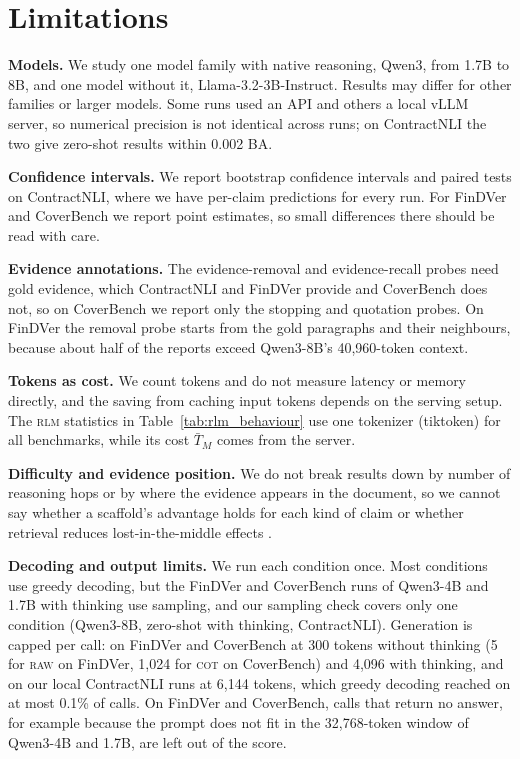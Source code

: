 \documentclass[11pt]{article}
\begin{document}
\section*{Limitations}

\noindent \textbf{Models.}
We study one model family with native reasoning, Qwen3, from 1.7B to 8B,
and one model without it, Llama-3.2-3B-Instruct. Results may differ for
other families or larger models. Some runs used an API and others a local
vLLM server, so numerical precision is not identical across runs; on
ContractNLI the two give zero-shot results within 0.002 BA.

\noindent \textbf{Confidence intervals.}
We report bootstrap confidence intervals and paired tests on ContractNLI,
where we have per-claim predictions for every run. For FinDVer and
CoverBench we report point estimates, so small differences there should
be read with care.

\noindent \textbf{Evidence annotations.}
The evidence-removal and evidence-recall probes need gold evidence, which
ContractNLI and FinDVer provide and CoverBench does not, so on CoverBench
we report only the stopping and quotation probes. On FinDVer the removal
probe starts from the gold paragraphs and their neighbours, because about
half of the reports exceed Qwen3-8B's 40,960-token context.

\noindent \textbf{Tokens as cost.}
We count tokens and do not measure latency or memory directly, and the
saving from caching input tokens depends on the serving setup. The
\textsc{rlm} statistics in Table~\ref{tab:rlm_behaviour} use one tokenizer
(tiktoken) for all benchmarks, while its cost $\bar{T}_M$ comes from the
server.

\noindent \textbf{Difficulty and evidence position.}
We do not break results down by number of reasoning hops or by where the
evidence appears in the document, so we cannot say whether a scaffold's
advantage holds for each kind of claim or whether retrieval reduces
lost-in-the-middle effects \citep{liu2024lost}.

\noindent \textbf{Decoding and output limits.}
We run each condition once. Most conditions use greedy decoding, but the
FinDVer and CoverBench runs of Qwen3-4B and 1.7B with thinking use
sampling, and our sampling check covers only one condition (Qwen3-8B,
zero-shot with thinking, ContractNLI). Generation is capped per call: on
FinDVer and CoverBench at 300 tokens without thinking (5 for \textsc{raw}
on FinDVer, 1,024 for \textsc{cot} on CoverBench) and 4,096 with thinking,
and on our local ContractNLI runs at
6,144 tokens, which greedy decoding reached on at most 0.1\% of calls. On
FinDVer and CoverBench, calls that return no answer, for example because
the prompt does not fit in the 32,768-token window of Qwen3-4B and 1.7B,
are left out of the score.
\end{document}
